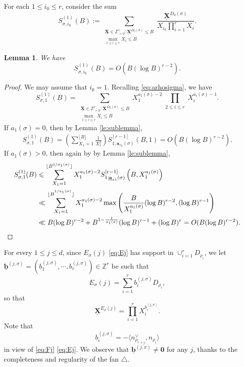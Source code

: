 \documentclass[11pt,letterpaper]{amsart}
\newcommand{\BZ}{{\mathbb {Z}}}
\newcommand{\XX}{\underline{\mathbf{X}}}
\renewcommand{\aa}{\underline{\mathbf{a}}}
\newcommand{\bb}{\underline{\mathbf{b}}}
\theoremstyle{plain}
\numberwithin{equation}{section}
\newtheorem{lemma}[theorem]{Lemma}
\theoremstyle{definition}
\theoremstyle{remark}
\begin{document}
For each $1\leqslant i_0\leqslant r$, consider the sum \begin{equation}\label{eq:Sprimebd}
	S^{(1)}_{\sigma,i_0}(B):=\sum_{\substack{\XX\in\BZ_{>0}^r:\XX^{D_0(\sigma)}\leqslant B\\ \max_{1\leqslant i\leqslant r}X_i\leqslant B}}\frac{\XX^{D_0(\sigma)}}{X_{i_0}\prod_{i=1}^{r}X_i}.
\end{equation}
\begin{lemma}\label{le:twospecsum2}
	We have	$$S^{(1)}_{\sigma,i_0}(B)=O(B(\log B)^{r-2}).$$
\end{lemma}
\begin{proof}
	We may assume that $i_0=1$. Recalling \eqref{eq:arhosigma}, we have $$S^{(1)}_{\sigma,1}(B)=\sum_{\substack{\XX\in\BZ_{>0}^r:\XX^{D_0(\sigma)}\leqslant B\\ \max_{1\leqslant i\leqslant r}X_i\leqslant B}}X_{1}^{a_{1}(\sigma)-2}\prod_{\substack{2\leqslant i\leqslant r}}X_i^{a_i(\sigma)-1}.$$
	If $a_{1}(\sigma)=0$, then by Lemma \ref{le:sublemma},
	\begin{align*}
		S^{(1)}_{\sigma,1}(B)=\left(\sum_{X_{1}=1}^{\lfloor B\rfloor}\frac{1}{X_{1}^2}\right) S_{1;\aa_{*1}(\sigma)}^{[r-1]}(B,1)=O(B(\log B)^{r-2}).
	\end{align*}
	If $a_{1}(\sigma)>0$, then again by by Lemma \ref{le:sublemma},
	\begin{align*}
		S^{(1)}_{\sigma,1}(B)&\leqslant\sum_{X_{1}=1}^{\lfloor B^{1/a_{1}(\sigma)}\rfloor}X_1^{a_{1}(\sigma)-2}S_{1;\aa_{*1}(\sigma)}^{[r-1]}\left(B,X_{1}^{a_{1}(\sigma)}\right)\\ &\ll \sum_{X_{1}=1}^{\lfloor B^{^{1/a_{1}(\sigma)}}\rfloor}X_1^{a_{1}(\sigma)-2}\max\left(\frac{B}{X_{1}^{a_{1}(\sigma)}}(\log B)^{r-2},(\log B)^{r-1}\right)\\ &\ll B(\log B)^{r-2}+B^{1-\frac{1}{a_{1}(\sigma)}}(\log B)^{r-1}+(\log B)^r=O(B(\log B)^{r-2}). \qedhere
	\end{align*}
\end{proof}

For every $1\leqslant j\leqslant d$, since $E_\sigma(j)$ \eqref{eq:Ej} has support in $\cup_{i=1}^r D_{\rho_i}$, we let $\bb^{(j,\sigma)}=(b_1^{(j,\sigma)},\cdots,b_r^{(j,\sigma)})\in\BZ^r$ be such that
\begin{equation}\label{eq:Esigmajbij}
	E_\sigma(j)=\sum_{i=1}^{r}b_i^{(j,\sigma)}D_{\rho_i},
\end{equation} so that
\begin{equation}\label{eq:bijsigma}
	\XX^{E_\sigma(j)}=\prod_{i=1}^rX_i^{b_i^{(j,\sigma)}}.
\end{equation}
Note that $$b_i^{(j,\sigma)}=-\langle n_{\rho_{r+j}}^\vee,n_{\rho_i}\rangle$$ in view of \eqref{eq:Fj} \eqref{eq:Ej}. We observe that $\bb^{(j,\sigma)}\neq \mathbf{0}$ for any $j$, thanks to the completeness and regularity of the fan $\triangle$.
\end{document}
